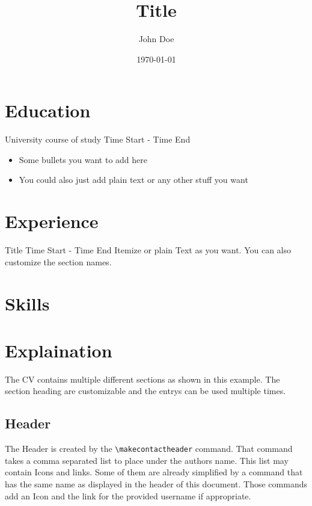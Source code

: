 \documentclass{customcv}
\author{John Doe}
\date{\today}
\title{Title}
\begin{document}

\section{Education}

{University}
{course of study}
{Time Start - Time End}
{
  \begin{itemize}
    \item Some bullets you want to add here
    \item You could also just add plain text or any other stuff you want
  \end{itemize}
}

\section{Experience}

{Title}
{Time Start - Time End}
{
  \smallskip
  Itemize or plain Text as you want.
  You can also customize the section names.
}

\section{Skills}



\section{Explaination}

The CV contains multiple different sections as shown in this example.
The section heading are customizable and the entrys can be used multiple times.

\subsection{Header}

The Header is created by the \texttt{\textbackslash{}makecontactheader} command.
That command takes a comma separated list to place under the authors name.
This list may contain Icons and links.
Some of them are already simplified by a command that has the same name as
displayed in the header of this document.
Those commands add an Icon and the link for the provided username if appropriate.
\end{document}
